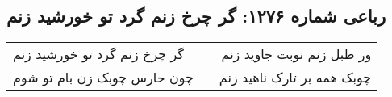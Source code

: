 \begin{center}
\section*{رباعی شماره ۱۲۷۶: گر چرخ زنم گرد تو خورشید زنم}
\label{sec:1276}
\begin{longtable}{l p{0.5cm} r}
گر چرخ زنم گرد تو خورشید زنم
&&
ور طبل زنم نوبت جاوید زنم
\\
چون حارس چوبک زن بام تو شوم
&&
چوبک همه بر تارک ناهید زنم
\\
\end{longtable}
\end{center}
